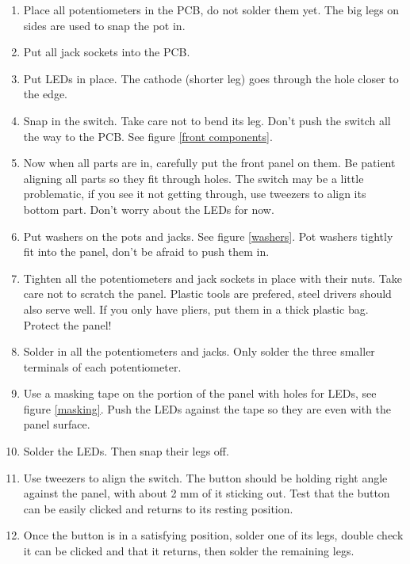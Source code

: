 \documentclass[10pt,a4paper,twocolumn]{article}
\begin{document}
\begin{enumerate}
  \item Place all potentiometers in the PCB, do not solder them yet. The big legs on sides are used to snap the pot in.
  \item Put all jack sockets into the PCB.
  \item Put LEDs in place. The cathode (shorter leg) goes through the hole closer to the edge.
  \item Snap in the switch. Take care not to bend its leg. Don't push the switch all the way to the PCB. See figure \ref{front components}.
  \item Now when all parts are in, carefully put the front panel on them. Be patient aligning all parts so they fit through holes. The switch may be a little problematic, if you see it not getting through, use tweezers to align its bottom part. Don't worry about the LEDs for now.
  \item Put washers on the pots and jacks. See figure \ref{washers}. Pot washers tightly fit into the panel, don't be afraid to push them in.
  \item Tighten all the potentiometers and jack sockets in place with their nuts. Take care not to scratch the panel. Plastic tools are prefered, steel drivers should also serve well. If you only have pliers, put them in a thick plastic bag. Protect the panel!
  \item Solder in all the potentiometers and jacks. Only solder the three smaller terminals of each potentiometer.
  \item Use a masking tape on the portion of the panel with holes for LEDs, see figure \ref{masking}. Push the LEDs against the tape so they are even with the panel surface.
  \item Solder the LEDs. Then snap their legs off.
  \item Use tweezers to align the switch. The button should be holding right angle against the panel, with about 2 mm of it sticking out. Test that the button can be easily clicked and returns to its resting position.
  \item Once the button is in a satisfying position, solder one of its legs, double check it can be clicked and that it returns, then solder the remaining legs.
\end{enumerate}
\end{document}

